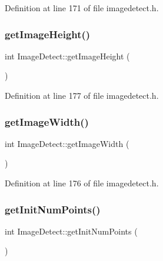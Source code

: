 Definition at line 171 of file imagedetect.\+h.

\mbox{\label{class_image_detect_a68a50fce55888eb61c8cd13b9e89a2d6}} 
\subsubsection{\texorpdfstring{getImageHeight()}{getImageHeight()}}
{\footnotesize\ttfamily int Image\+Detect\+::get\+Image\+Height (\begin{DoxyParamCaption}{ }\end{DoxyParamCaption})\hspace{0.3cm}{\ttfamily [inline]}}



Definition at line 177 of file imagedetect.\+h.

\mbox{\label{class_image_detect_afd28916cc8e9627eed3e47757b770258}} 
\subsubsection{\texorpdfstring{getImageWidth()}{getImageWidth()}}
{\footnotesize\ttfamily int Image\+Detect\+::get\+Image\+Width (\begin{DoxyParamCaption}{ }\end{DoxyParamCaption})\hspace{0.3cm}{\ttfamily [inline]}}



Definition at line 176 of file imagedetect.\+h.

\mbox{\label{class_image_detect_a44343ed4640409fea5062b82ceb421c6}} 
\subsubsection{\texorpdfstring{getInitNumPoints()}{getInitNumPoints()}}
{\footnotesize\ttfamily int Image\+Detect\+::get\+Init\+Num\+Points (\begin{DoxyParamCaption}{ }\end{DoxyParamCaption})\hspace{0.3cm}{\ttfamily [inline]}}



